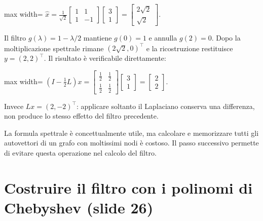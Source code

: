 \documentclass[11pt,a4paper,oneside,openany]{book}
\begin{document}
\begin{center}
\begin{adjustbox}{max width=\linewidth}
$\displaystyle \widehat x=\frac1{\sqrt2}\begin{bmatrix}1&1\\1&-1\end{bmatrix}
\begin{bmatrix}3\\1\end{bmatrix}
=\begin{bmatrix}2\sqrt2\\\sqrt2\end{bmatrix}.$
\end{adjustbox}
\end{center}

Il filtro \(g(\lambda)=1-\lambda/2\) mantiene \(g(0)=1\) e annulla \(g(2)=0\). Dopo la moltiplicazione spettrale rimane \((2\sqrt2,0)^\top\) e la ricostruzione restituisce \(y=(2,2)^\top\). Il risultato è verificabile direttamente:

\begin{center}
\begin{adjustbox}{max width=\linewidth}
$\displaystyle \left(I-\frac12L\right)x=
\begin{bmatrix}\frac12&\frac12\\\frac12&\frac12\end{bmatrix}
\begin{bmatrix}3\\1\end{bmatrix}=\begin{bmatrix}2\\2\end{bmatrix}.$
\end{adjustbox}
\end{center}

Invece \(Lx=(2,-2)^\top\): applicare soltanto il Laplaciano conserva una differenza, non produce lo stesso effetto del filtro precedente.

La formula spettrale è concettualmente utile, ma calcolare e memorizzare tutti gli autovettori di un grafo con moltissimi nodi è costoso. Il passo successivo permette di evitare questa operazione nel calcolo del filtro.

\section{Costruire il filtro con i polinomi di Chebyshev (slide 26)}\label{f05-r403}
\end{document}
